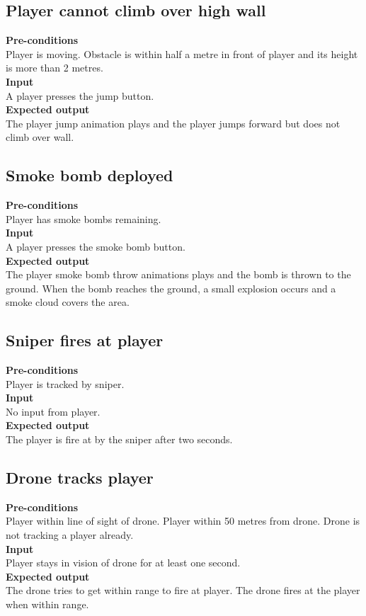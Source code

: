 \documentclass[a4paper,10pt]{article}
\begin{document}
    \subsection{Player cannot climb over high wall}
    \textbf{Pre-conditions}\\
    Player is moving. Obstacle is within half a metre in front of player and its height is more than 2 metres. 
    \smallskip\\\textbf{Input}\\
    A player presses the jump button.
    \smallskip\\\textbf{Expected output}\\
    The player jump animation plays and the player jumps forward but does not climb over wall.
        
    \subsection{Smoke bomb deployed}
    \textbf{Pre-conditions}\\
    Player has smoke bombs remaining.
    \smallskip\\\textbf{Input}\\
    A player presses the smoke bomb button.
    \smallskip\\\textbf{Expected output}\\
    The player smoke bomb throw animations plays and the bomb is thrown to the ground. When the bomb reaches the ground, a small explosion occurs and a smoke cloud covers the area.
    
    \subsection{Sniper fires at player}
    \textbf{Pre-conditions}\\
    Player is tracked by sniper.
    \smallskip\\\textbf{Input}\\
    No input from player.
    \smallskip\\\textbf{Expected output}\\
    The player is fire at by the sniper after two seconds.
    
    \subsection{Drone tracks player}
    \textbf{Pre-conditions}\\
    Player within line of sight of drone. Player within 50 metres from drone. Drone is not tracking a player already.
    \smallskip\\\textbf{Input}\\
    Player stays in vision of drone for at least one second.
    \smallskip\\\textbf{Expected output}\\
    The drone tries to get within range to fire at player. The drone fires at the player when within range.
    
\end{document}
